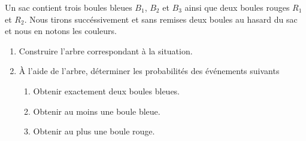 
\begin{exercice}\label{exosmath-0708}

    Un sac contient trois boules bleues \( B_1\), \( B_2\) et \( B_3\) ainsi que deux boules rouges \( R_1\) et \( R_2\). Nous tirons succéssivement et sans remises deux boules au hasard du sac et nous en notons les couleurs.
    \begin{enumerate}
        \item
            Construire l'arbre correspondant à la situation.
        \item
            À l'aide de l'arbre, déterminer les probabilités des événements suivants
            \begin{enumerate}
                \item
                    Obtenir exactement deux boules bleues.
                \item
                    Obtenir au moins une boule bleue.
                \item
                    Obtenir au plus une boule rouge.
            \end{enumerate}
    \end{enumerate}

\end{exercice}
